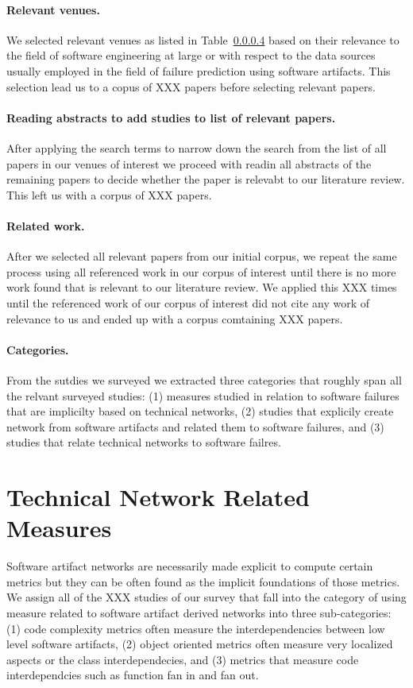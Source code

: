 \paragraph{Relevant venues.} We selected relevant venues as listed in Table~\ref{} based on their relevance to the field of software engineering at large or with respect to the data sources usually employed in the field of failure prediction using software artifacts.
This selection lead us to a copus of XXX papers before selecting relevant papers.

\paragraph{Reading abstracts to add studies to list of relevant papers.} After applying the search terms to narrow down the search from the list of all papers in our venues of interest we proceed with readin all abstracts of the remaining papers to decide whether the paper is relevabt to our literature review.
This left us with a corpus of XXX papers.

\paragraph{Related work.} After we selected all relevant papers from our initial corpus, we repeat the same process using all referenced work in our corpus of interest until there is no more work found that is relevant to our literature review.
We applied this XXX times until the referenced work of our corpus of interest did not cite any work of relevance to us and ended up with a corpus comtaining XXX papers.

\paragraph{Categories.} From the sutdies we surveyed we extracted three categories that roughly span all the relvant surveyed studies:
(1) measures studied in relation to software failures that are implicilty based on technical networks,
(2) studies that explicily create network from software artifacts and related them to software failures,
and (3) studies that relate technical networks to software failres.

\section{Technical Network Related Measures}
\label{chap:6:measure}
Software artifact networks are necessarily made explicit to compute certain metrics but they can be often found as the implicit foundations of those metrics.
We assign all of the XXX studies of our survey that fall into the category of using measure related to software artifact derived networks into three sub-categories:
(1) code complexity metrics often measure the interdependencies between low level software artifacts,
(2) object oriented metrics often measure very localized aspects or the class interdependecies,
and (3) metrics that measure code interdependcies such as function fan in and fan out.


